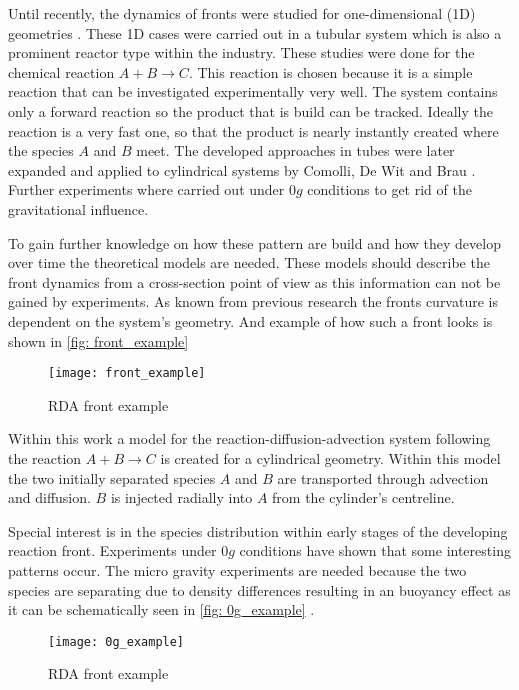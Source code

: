 \documentclass[../thesis.tex]{subfiles}
\begin{document}
Until recently, the dynamics of fronts were studied for one-dimensional (1D) geometries \cite{PhysRevA.38.3151}. These 1D cases were carried out in a tubular system which is also a prominent reactor type within the industry. These studies were done for the chemical reaction $ A+B \rightarrow C$. This reaction is chosen because it is a simple reaction that can be investigated experimentally very well. The system contains only a forward reaction so the product that is build can be tracked. Ideally the reaction is a very fast one, so that the product is nearly instantly created where the species $A$ and $B$ meet. The developed approaches in tubes were later expanded and applied to cylindrical systems by Comolli, De Wit and Brau \cite{comolli2021dynamics}. Further experiments where carried out under $0g$ conditions \cite{stergiou2022effects} to get rid of the gravitational influence.

To gain further knowledge on how these pattern are build and how they develop over time the theoretical models are needed. These models should describe the front dynamics from a cross-section point of view as this information can not be gained by experiments. As known from previous research the fronts curvature is dependent on the system's geometry. And example of how such a front looks is shown in \autoref{fig: front_example}
\begin{figure}[htbp]
	\centering
	\texttt{[image: front\_example]}
	\caption{RDA front example}
	\label{fig: front_example}
\end{figure}
Within this work a model for the reaction-diffusion-advection system following the reaction $ A+B \rightarrow C$ is created for a cylindrical geometry. Within this model the two initially separated species $A$ and $B$ are transported through advection and diffusion. $B$ is injected radially into $A$ from the cylinder's centreline. 

Special interest is in the species distribution within early stages of the developing reaction front. Experiments under $0g$ conditions have shown that some interesting patterns occur. The micro gravity experiments are needed because the two species are separating due to density differences resulting in an buoyancy effect as it can be schematically seen in \autoref{fig: 0g_example} \cite{stergiou2022effects}.
\begin{figure}[htbp]
	\centering
	\texttt{[image: 0g\_example]}
	\caption{RDA front example}
	\label{fig: 0g_example}
\end{figure}
\end{document}
